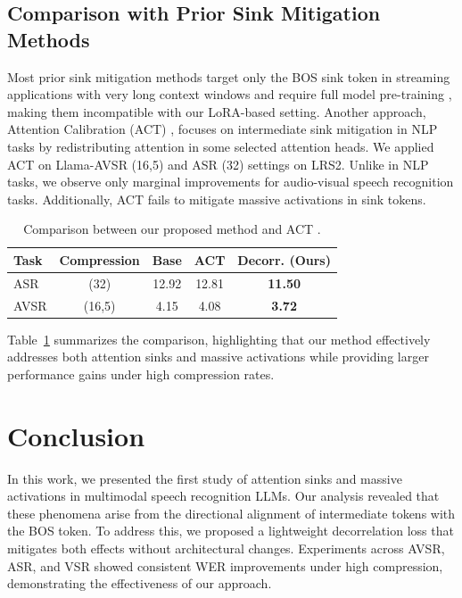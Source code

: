 \documentclass{article}
\begin{document}
\subsection{Comparison with Prior Sink Mitigation Methods}
Most prior sink mitigation methods target only the BOS sink token in streaming applications with very long context windows and require full model pre-training \cite{xiao2023streamingllm, zuhri2025softpick}, making them incompatible with our LoRA-based setting. Another approach, Attention Calibration (ACT) \cite{yu2024unveiling}, focuses on intermediate sink mitigation in NLP tasks by redistributing attention in some selected attention heads. We applied ACT on Llama-AVSR (16,5) and ASR (32) settings on LRS2. Unlike in NLP tasks, we observe only marginal improvements for audio-visual speech recognition tasks. Additionally, ACT fails to mitigate massive activations in sink tokens.
\begin{table}[t]
    \centering
    \caption{Comparison between our proposed method and ACT \cite{yu2024unveiling}.}
    \begin{tabular}{lcccc}
        \toprule
        \textbf{Task} & \textbf{Compression} & \textbf{Base} & \textbf{ACT} & \textbf{Decorr. (Ours)} \\
        \midrule
        ASR & (32) & 12.92 & 12.81 & \textbf{11.50} \\
        \hdashline
        AVSR & (16,5) & 4.15 & 4.08 & \textbf{3.72} \\
        \bottomrule
    \end{tabular}
    \label{tab:act_comparison}
    \vspace{-0.3cm}
    
\end{table}
Table~\ref{tab:act_comparison} summarizes the comparison, highlighting that our method effectively addresses both attention sinks and massive activations while providing larger performance gains under high compression rates.



\section{Conclusion}
In this work, we presented the first study of attention sinks and massive activations in multimodal speech recognition LLMs. Our analysis revealed that these phenomena arise from the directional alignment of intermediate tokens with the BOS token. To address this, we proposed a lightweight decorrelation loss that mitigates both effects without architectural changes. Experiments across AVSR, ASR, and VSR showed consistent WER improvements under high compression, demonstrating the effectiveness of our approach.
\end{document}
